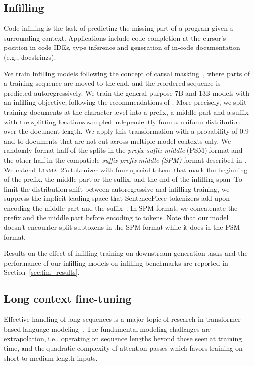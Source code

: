\documentclass[10pt]{article}
\newcommand{\llamavtwo}{\textsc{Llama~2}\xspace}
\begin{document}
\subsection{Infilling}
\label{sec:infilling}
Code infilling is the task of predicting the missing part of a program given a surrounding context. Applications include code completion at the cursor's position in code IDEs, type inference and generation of in-code documentation (e.g., docstrings). 

We train infilling models following the concept of causal masking~\citep{aghajanyan2022cm3,fried2022incoder}, where parts of a training sequence are moved to the end, and the reordered sequence is predicted autoregressively. We train the general-purpose 7B and 13B models with an infilling objective, following the recommendations of \citet{bavarian2022efficient}. More precisely, we split training documents at the character level into a prefix, a middle part and a suffix with the splitting locations sampled independently from a uniform distribution over the document length. We apply this transformation with a probability of 0.9 and  to documents that are not cut across multiple model contexts only. We randomly format half of the splits in the \emph{prefix-suffix-middle} (PSM) format and the other half in the compatible \emph{suffix-prefix-middle (SPM)} format described in \citet[App. D]{bavarian2022efficient}. We extend \llamavtwo's tokenizer with four special tokens that mark the beginning of the prefix, the middle part or the suffix, and the end of the infilling span. To limit the distribution shift between autoregressive and infilling training, we suppress the implicit leading space that SentencePiece tokenizers add upon encoding the middle part and the suffix~\citep{kudo2018sentencepiece}. In SPM format, we concatenate the prefix and the middle part before encoding to tokens. Note that our model doesn't encounter split subtokens in the SPM format while it does in the PSM format.

Results on the effect of infilling training on downstream generation tasks and the performance of our infilling models on infilling benchmarks are reported in Section~\ref{sec:fim_results}.
 
\subsection{Long context fine-tuning}
\label{sec:long_context}
Effective handling of long sequences is a major topic of research in transformer-based language modeling~\citep{vaswani2017attention}.
The fundamental modeling challenges are extrapolation, i.e., operating on sequence lengths beyond those seen at training time, and the quadratic complexity of attention passes which favors training on short-to-medium length inputs.
\end{document}
